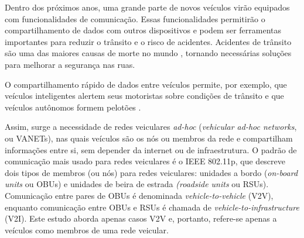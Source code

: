 \begin{resumoextendido}
%	
%	
	
	Dentro dos próximos anos, uma grande parte de novos veículos virão equipados com funcionalidades de comunicação.
	Essas funcionalidades permitirão o compartilhamento de dados com outros dispositivos e podem ser ferramentas importantes para reduzir o trânsito e o risco de acidentes.
	Acidentes de trânsito são uma das maiores causas de morte no mundo \citep{whofactsheet}, tornando necessárias soluções para melhorar a segurança nas ruas.
	
	O compartilhamento rápido de dados entre veículos permite, por exemplo, que veículos inteligentes alertem seus motoristas sobre condições de trânsito \citep{lee2004collision} e que veículos autônomos formem pelotões \citep{amoozadeh2015platoon}.
	
	Assim, surge a necessidade de redes veiculares \textit{ad-hoc} (\textit{vehicular ad-hoc networks}, ou VANETs), nas quais veículos são os nós ou membros da rede e compartilham informações entre si, sem depender da internet ou de infraestrutura.
	O padrão de comunicação mais usado para redes veiculares é o IEEE 802.11p, que descreve dois tipos de membros (ou nós) para redes veiculares: unidades a bordo (\textit{on-board units} ou OBUs) e unidades de beira de estrada \textit(\textit{roadside units} ou RSUs).
	Comunicação entre pares de OBUs é denominada \textit{vehicle-to-vehicle} (V2V), enquanto comunicação entre OBUs e RSUs é chamada de \textit{vehicle-to-infrastructure} (V2I).
	Este estudo aborda apenas casos V2V e, portanto, refere-se apenas a veículos como membros de uma rede veicular.
	

\end{resumoextendido}
